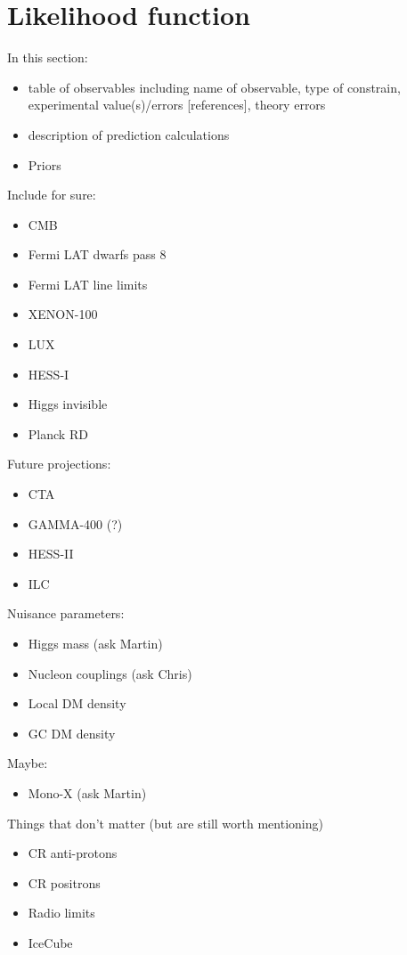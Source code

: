 \section{Likelihood function}
\label{lnL}

In this section:
\begin{itemize}
  \item table of observables including name of observable, type of constrain,
    experimental value(s)/errors [references], theory errors
  \item description of prediction calculations
  \item Priors
\end{itemize}

Include for sure:
\begin{itemize}
  \item CMB
  \item Fermi LAT dwarfs pass 8
  \item Fermi LAT line limits
  \item XENON-100
  \item LUX
  \item HESS-I
  \item Higgs invisible
  \item Planck RD
\end{itemize}

Future projections:
\begin{itemize}
  \item CTA
  \item GAMMA-400 (?)
  \item HESS-II
  \item ILC
\end{itemize}

Nuisance parameters:
\begin{itemize}
  \item Higgs mass (ask Martin)
  \item Nucleon couplings (ask Chris)
  \item Local DM density
  \item GC DM density
\end{itemize}

Maybe:
\begin{itemize}
  \item Mono-X (ask Martin)
\end{itemize}

Things that don't matter (but are still worth mentioning)
\begin{itemize}
  \item CR anti-protons
  \item CR positrons
  \item Radio limits
  \item IceCube
\end{itemize}



